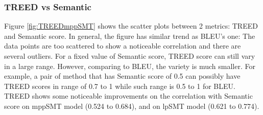 \subsubsection{\textbf{TREED vs Semantic}}


Figure \ref{fig:TREEDmppSMT} shows the scatter plots between 2 metrics: TREED and Semantic score. In general, the figure has similar trend as BLEU's one: The data points are too scattered to show a noticeable correlation and there are several outliers. For a fixed value of Semantic score, TREED score can still vary in a large range. However, comparing to BLEU, the variety is much smaller. For example, a pair of method that has Semantic score of 0.5 can possibly have TREED scores in range of 0.7 to 1 while such range is 0.5 to 1 for BLEU. TREED shows some noticeable improvements on the correlation with Semantic score on mppSMT model (0.524 to 0.684), and on lpSMT model (0.621 to 0.774). 

%





